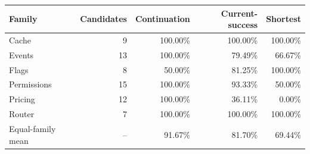 \begin{tabular}{@{}lrrrr@{}}
\toprule
Family & Candidates & Continuation & Current-success & Shortest \\
\midrule
Cache & 9 & 100.00\% & 100.00\% & 100.00\% \\
Events & 13 & 100.00\% & 79.49\% & 66.67\% \\
Flags & 8 & 50.00\% & 81.25\% & 100.00\% \\
Permissions & 15 & 100.00\% & 93.33\% & 50.00\% \\
Pricing & 12 & 100.00\% & 36.11\% & 0.00\% \\
Router & 7 & 100.00\% & 100.00\% & 100.00\% \\
\midrule
Equal-family mean & -- & 91.67\% & 81.70\% & 69.44\% \\
\bottomrule
\end{tabular}
